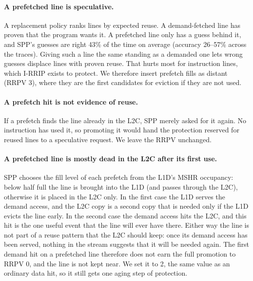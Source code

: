 \documentclass[11pt,a4paper]{article}
\begin{document}
\paragraph{A prefetched line is speculative.} A replacement policy ranks lines by expected reuse. A demand-fetched line has proven
that the program wants it. A prefetched line only has a guess behind it, and SPP's guesses are right 43\% of the time on
average (accuracy 26--57\% across the traces). Giving such a line the same standing as a demanded one lets wrong guesses
displace lines with proven reuse. That hurts most for instruction lines, which I-RRIP exists to protect. We therefore insert prefetch
fills as distant (RRPV 3), where they are the first candidates for eviction if they are not used.

\paragraph{A prefetch hit is not evidence of reuse.} If a prefetch finds the line already in the L2C, SPP merely asked for it again.
No instruction has used it, so promoting it would hand the protection reserved for reused lines to a speculative request. We leave the
RRPV unchanged.

\paragraph{A prefetched line is mostly dead in the L2C after its first use.} SPP chooses the fill level of each prefetch from the
L1D's MSHR occupancy: below half full the line is brought into the L1D (and passes through the L2C), otherwise it is placed in the L2C only.
In the first case the L1D serves the demand access, and the L2C copy is a second copy that is needed only if the L1D evicts the line early.
In the second case the demand access hits the L2C, and this hit is the one useful event that the line will ever have there.
Either way the line is not part of a reuse pattern that the L2C should keep: once its demand access has been served, nothing in the stream
suggests that it will be needed again. The first demand hit on a prefetched line therefore does not earn the full promotion to RRPV 0,
and the line is not kept near. We set it to 2, the same value as an ordinary data hit, so it still gets one aging step of protection.
\end{document}
